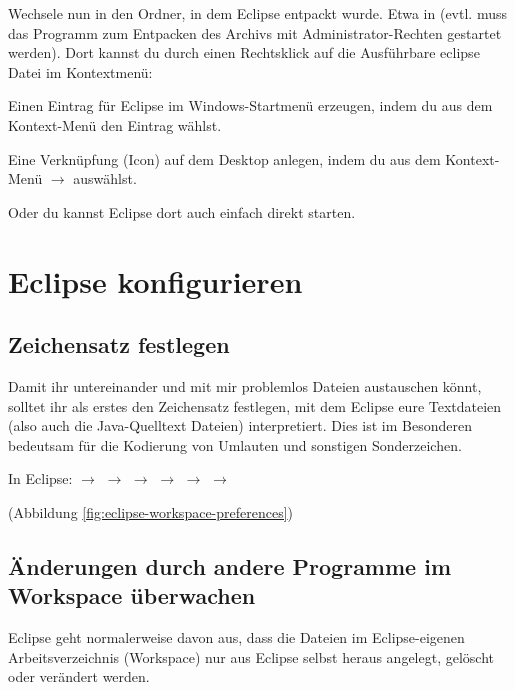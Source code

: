 Wechsele nun in den Ordner, in dem Eclipse entpackt wurde. Etwa in
 (evtl. muss das
Programm zum Entpacken des Archivs mit Administrator-Rechten gestartet werden).
Dort kannst du durch einen Rechtsklick auf die Ausführbare eclipse Datei im
Kontextmenü:

\begin{compactitem}

\item Einen Eintrag für Eclipse im Windows-Startmenü erzeugen, indem du aus dem
Kontext-Menü den Eintrag  wählst.

\item Eine Verknüpfung (Icon) auf dem Desktop anlegen, indem du aus dem
Kontext-Menü  $\rightarrow$  auswählst.

\end{compactitem}

Oder du kannst Eclipse dort auch einfach direkt starten.

\section{Eclipse konfigurieren}

\subsection{Zeichensatz festlegen}

Damit ihr untereinander und mit mir problemlos Dateien austauschen könnt,
solltet ihr als erstes den Zeichensatz festlegen, mit dem Eclipse eure
Textdateien (also auch die Java-Quelltext Dateien) interpretiert. Dies ist im
Besonderen bedeutsam für die Kodierung von Umlauten und sonstigen
Sonderzeichen.

In Eclipse:  $\rightarrow$  $\rightarrow$
 $\rightarrow$  $\rightarrow$  $\rightarrow$  $\rightarrow$ 

(Abbildung \ref{fig:eclipse-workspace-preferences}) 

\subsection{Änderungen durch andere Programme im Workspace überwachen}

Eclipse geht normalerweise davon aus, dass die Dateien im Eclipse-eigenen
Arbeitsverzeichnis (Workspace) nur aus Eclipse selbst heraus angelegt, gelöscht
oder verändert werden.

